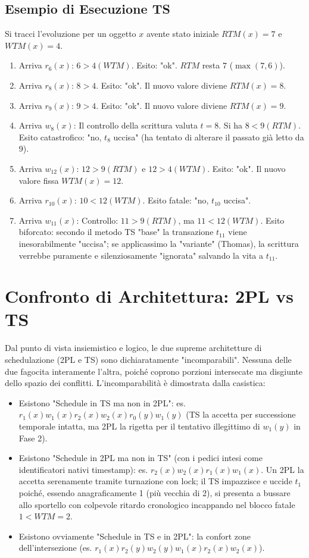\subsection{Esempio di Esecuzione TS}
Si tracci l'evoluzione per un oggetto $x$ avente stato iniziale $RTM(x)=7$ e $WTM(x)=4$.
\begin{enumerate}
    \item Arriva $r_6(x)$: $6 > 4 (WTM)$. Esito: "ok". $RTM$ resta $7$ ($\max(7,6)$).
    \item Arriva $r_8(x)$: $8 > 4$. Esito: "ok". Il nuovo valore diviene $RTM(x)=8$.
    \item Arriva $r_9(x)$: $9 > 4$. Esito: "ok". Il nuovo valore diviene $RTM(x)=9$.
    \item Arriva $w_8(x)$: Il controllo della scrittura valuta $t=8$. Si ha $8 < 9 (RTM)$. Esito catastrofico: "no, $t_8$ uccisa" (ha tentato di alterare il passato già letto da 9).
    \item Arriva $w_{12}(x)$: $12 > 9 (RTM)$ e $12 > 4 (WTM)$. Esito: "ok". Il nuovo valore fissa $WTM(x)=12$.
    \item Arriva $r_{10}(x)$: $10 < 12 (WTM)$. Esito fatale: "no, $t_{10}$ uccisa".
    \item Arriva $w_{11}(x)$: Controllo: $11 > 9 (RTM)$, ma $11 < 12 (WTM)$. Esito biforcato: secondo il metodo TS "base" la transazione $t_{11}$ viene inesorabilmente "uccisa"; se applicassimo la "variante" (Thomas), la scrittura verrebbe puramente e silenziosamente "ignorata" salvando la vita a $t_{11}$.
\end{enumerate}

\section{Confronto di Architettura: 2PL vs TS}

Dal punto di vista insiemistico e logico, le due supreme architetture di schedulazione (2PL e TS) sono dichiaratamente "incomparabili". Nessuna delle due fagocita interamente l'altra, poiché coprono porzioni intersecate ma disgiunte dello spazio dei conflitti.
L'incomparabilità è dimostrata dalla casistica:
\begin{itemize}
    \item Esistono "Schedule in TS ma non in 2PL": es. $r_1(x) w_1(x) r_2(x) w_2(x) r_0(y) w_1(y)$ (TS la accetta per successione temporale intatta, ma 2PL la rigetta per il tentativo illegittimo di $w_1(y)$ in Fase 2).
    \item Esistono "Schedule in 2PL ma non in TS" (con i pedici intesi come identificatori nativi timestamp): es. $r_2(x) w_2(x) r_1(x) w_1(x)$. Un 2PL la accetta serenamente tramite turnazione con lock; il TS impazzisce e uccide $t_1$ poiché, essendo anagraficamente 1 (più vecchia di 2), si presenta a bussare allo sportello con colpevole ritardo cronologico incappando nel blocco fatale $1 < WTM=2$.
    \item Esistono ovviamente "Schedule in TS e in 2PL": la confort zone dell'intersezione (es. $r_1(x) r_2(y) w_2(y) w_1(x) r_2(x) w_2(x)$).
\end{itemize}

